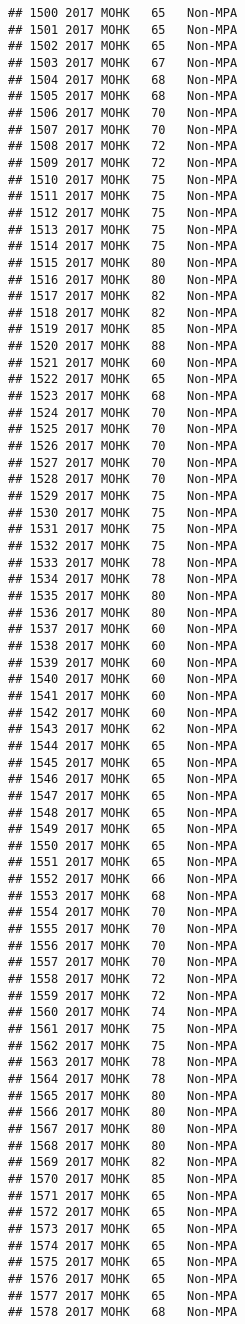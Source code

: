 \documentclass[]{article}
\begin{document}
\begin{verbatim}
## 1500 2017 MOHK   65   Non-MPA
## 1501 2017 MOHK   65   Non-MPA
## 1502 2017 MOHK   65   Non-MPA
## 1503 2017 MOHK   67   Non-MPA
## 1504 2017 MOHK   68   Non-MPA
## 1505 2017 MOHK   68   Non-MPA
## 1506 2017 MOHK   70   Non-MPA
## 1507 2017 MOHK   70   Non-MPA
## 1508 2017 MOHK   72   Non-MPA
## 1509 2017 MOHK   72   Non-MPA
## 1510 2017 MOHK   75   Non-MPA
## 1511 2017 MOHK   75   Non-MPA
## 1512 2017 MOHK   75   Non-MPA
## 1513 2017 MOHK   75   Non-MPA
## 1514 2017 MOHK   75   Non-MPA
## 1515 2017 MOHK   80   Non-MPA
## 1516 2017 MOHK   80   Non-MPA
## 1517 2017 MOHK   82   Non-MPA
## 1518 2017 MOHK   82   Non-MPA
## 1519 2017 MOHK   85   Non-MPA
## 1520 2017 MOHK   88   Non-MPA
## 1521 2017 MOHK   60   Non-MPA
## 1522 2017 MOHK   65   Non-MPA
## 1523 2017 MOHK   68   Non-MPA
## 1524 2017 MOHK   70   Non-MPA
## 1525 2017 MOHK   70   Non-MPA
## 1526 2017 MOHK   70   Non-MPA
## 1527 2017 MOHK   70   Non-MPA
## 1528 2017 MOHK   70   Non-MPA
## 1529 2017 MOHK   75   Non-MPA
## 1530 2017 MOHK   75   Non-MPA
## 1531 2017 MOHK   75   Non-MPA
## 1532 2017 MOHK   75   Non-MPA
## 1533 2017 MOHK   78   Non-MPA
## 1534 2017 MOHK   78   Non-MPA
## 1535 2017 MOHK   80   Non-MPA
## 1536 2017 MOHK   80   Non-MPA
## 1537 2017 MOHK   60   Non-MPA
## 1538 2017 MOHK   60   Non-MPA
## 1539 2017 MOHK   60   Non-MPA
## 1540 2017 MOHK   60   Non-MPA
## 1541 2017 MOHK   60   Non-MPA
## 1542 2017 MOHK   60   Non-MPA
## 1543 2017 MOHK   62   Non-MPA
## 1544 2017 MOHK   65   Non-MPA
## 1545 2017 MOHK   65   Non-MPA
## 1546 2017 MOHK   65   Non-MPA
## 1547 2017 MOHK   65   Non-MPA
## 1548 2017 MOHK   65   Non-MPA
## 1549 2017 MOHK   65   Non-MPA
## 1550 2017 MOHK   65   Non-MPA
## 1551 2017 MOHK   65   Non-MPA
## 1552 2017 MOHK   66   Non-MPA
## 1553 2017 MOHK   68   Non-MPA
## 1554 2017 MOHK   70   Non-MPA
## 1555 2017 MOHK   70   Non-MPA
## 1556 2017 MOHK   70   Non-MPA
## 1557 2017 MOHK   70   Non-MPA
## 1558 2017 MOHK   72   Non-MPA
## 1559 2017 MOHK   72   Non-MPA
## 1560 2017 MOHK   74   Non-MPA
## 1561 2017 MOHK   75   Non-MPA
## 1562 2017 MOHK   75   Non-MPA
## 1563 2017 MOHK   78   Non-MPA
## 1564 2017 MOHK   78   Non-MPA
## 1565 2017 MOHK   80   Non-MPA
## 1566 2017 MOHK   80   Non-MPA
## 1567 2017 MOHK   80   Non-MPA
## 1568 2017 MOHK   80   Non-MPA
## 1569 2017 MOHK   82   Non-MPA
## 1570 2017 MOHK   85   Non-MPA
## 1571 2017 MOHK   65   Non-MPA
## 1572 2017 MOHK   65   Non-MPA
## 1573 2017 MOHK   65   Non-MPA
## 1574 2017 MOHK   65   Non-MPA
## 1575 2017 MOHK   65   Non-MPA
## 1576 2017 MOHK   65   Non-MPA
## 1577 2017 MOHK   65   Non-MPA
## 1578 2017 MOHK   68   Non-MPA

\end{verbatim}
\end{document}
